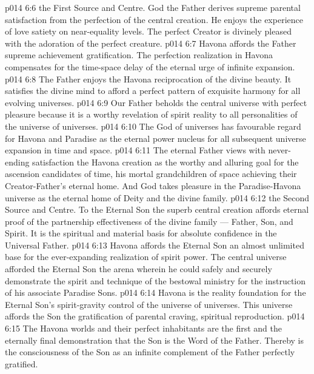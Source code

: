 \vs p014 6:6 \bibnobreakspace {} the First Source and Centre. God the Father derives supreme parental satisfaction from the perfection of the central creation. He enjoys the experience of love satiety on near\hyp{}equality levels. The perfect Creator is divinely pleased with the adoration of the perfect creature.
\vs p014 6:7 Havona affords the Father supreme achievement gratification. The perfection realization in Havona compensates for the time\hyp{}space delay of the eternal urge of infinite expansion.
\vs p014 6:8 The Father enjoys the Havona reciprocation of the divine beauty. It satisfies the divine mind to afford a perfect pattern of exquisite harmony for all evolving universes.
\vs p014 6:9 Our Father beholds the central universe with perfect pleasure because it is a worthy revelation of spirit reality to all personalities of the universe of universes.
\vs p014 6:10 The God of universes has favourable regard for Havona and Paradise as the eternal power nucleus for all subsequent universe expansion in time and space.
\vs p014 6:11 The eternal Father views with never\hyp{}ending satisfaction the Havona creation as the worthy and alluring goal for the ascension candidates of time, his mortal grandchildren of space achieving their Creator\hyp{}Father’s eternal home. And God takes pleasure in the Paradise\hyp{}Havona universe as the eternal home of Deity and the divine family.
\vs p014 6:12 \bibnobreakspace {} the Second Source and Centre. To the Eternal Son the superb central creation affords eternal proof of the partnership effectiveness of the divine family --- Father, Son, and Spirit. It is the spiritual and material basis for absolute confidence in the Universal Father.
\vs p014 6:13 Havona affords the Eternal Son an almost unlimited base for the ever\hyp{}expanding realization of spirit power. The central universe afforded the Eternal Son the arena wherein he could safely and securely demonstrate the spirit and technique of the bestowal ministry for the instruction of his associate Paradise Sons.
\vs p014 6:14 Havona is the reality foundation for the Eternal Son’s spirit\hyp{}gravity control of the universe of universes. This universe affords the Son the gratification of parental craving, spiritual reproduction.
\vs p014 6:15 The Havona worlds and their perfect inhabitants are the first and the eternally final demonstration that the Son is the Word of the Father. Thereby is the consciousness of the Son as an infinite complement of the Father perfectly gratified.

